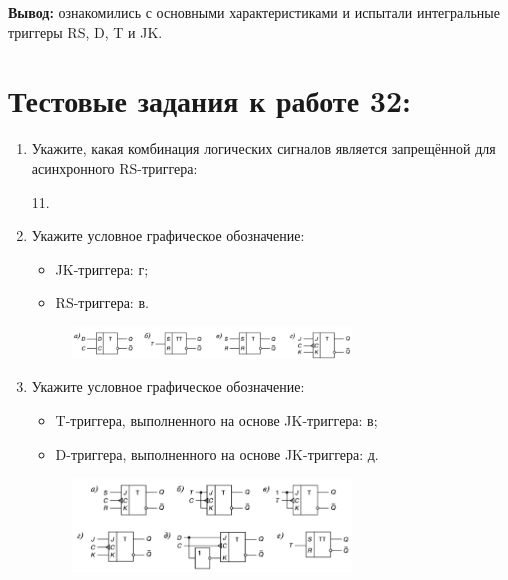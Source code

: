 \documentclass[spec, och, labwork]{shiza}
\begin{document}
\textbf{Вывод:} ознакомились с основными характеристиками и испытали интегральные триггеры RS, D, T и JK.

\section{Тестовые задания к работе 32:}

\begin{enumerate}
    \item Укажите, какая комбинация логических сигналов является запрещённой для асинхронного RS-триггера:
    
        11.

    \item Укажите условное графическое обозначение:
        \begin{itemize}
            \item JK-триггера: г;
            \item RS-триггера: в.
        \end{itemize}
    
        \begin{figure}[H]
            \centering
            \includegraphics[width=0.7\textwidth]{img/image13}
            \caption{}
        \end{figure}

    \item Укажите условное графическое обозначение:
        \begin{itemize}
            \item T-триггера, выполненного на основе JK-триггера: в;
            \item D-триггера, выполненного на основе JK-триггера: д.
        \end{itemize}

        \begin{figure}[H]
            \centering
            \includegraphics[width=0.7\textwidth]{img/image14}
            \caption{}
        \end{figure}


\end{enumerate}
\end{document}
